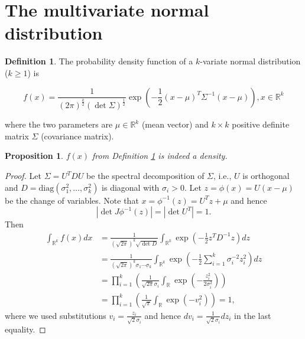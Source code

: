 \documentclass{book}
\theoremstyle{plain}%
\newtheorem{proposition}{Proposition}[section]
\theoremstyle{definition}
\newtheorem{definition}{Definition}[section]
\begin{document}
\section{The multivariate normal distribution}

\begin{definition}
The probability density function of a $k$-variate normal distribution ($k \geq 1$) is

$$f(x) = \frac{1}{(2\pi)^\frac{k}{2}(\det\Sigma)^\frac{1}{2}} \exp\left(-\frac{1}{2}(x-\mu)^T\Sigma^{-1}(x - \mu)\right), x \in \mathbb{R}^k$$

where the two parameters are $\mu \in \mathbb{R}^k$ (mean vector) and $k \times k$ positive definite matrix $\Sigma$ (covariance matrix).\label{def:normal}
\end{definition}

    \begin{proposition}
        \label{density}
        $f(x)$ from Definition \ref{def:normal} is indeed a density.
    \end{proposition}

\begin{proof}
    Let $\Sigma=U^TDU$ be the spectral decomposition of
    $\Sigma$, i.e., $U$ is orthogonal and $D=\mathrm{diag}(\sigma_1^2,\ldots,\sigma_k^2)$ is diagonal with $\sigma_i>0$.
    Let $z=\phi(x)=U(x-\mu)$ be the change of variables. Note that
    $x=\phi^{-1}(z)=U^Tz+\mu$ and
    hence 
    $$|\det J\phi^{-1}(z)|=
        |\det U^T|=1.$$
    Then
    \begin{align*}
    \int_{\mathbb{R}^k} f(x)dx
    &=
    \frac{1}{
    (\sqrt{2\pi})^k
    \sqrt{\det D}
    }\int_{\mathbb{R}^k} 
    \exp\left(
    -\frac{1}{2}
    z^T D^{-1} z
    \right)
    dz\\
    &=
    \frac{1}{
    (\sqrt{2\pi})^k
    \sigma_1\cdots\sigma_k}
    \int_{\mathbb{R}^k} 
    \exp\left(
    -\frac{1}{2}
    \sum_{i=1}^k
    \sigma_i^{-2}
    z_i^2
    \right)
    dz\\
    &=
    \prod_{i=1}^k
    \left(
    \frac{1}{\sqrt{2\pi}\sigma_i}
    \int_{\mathbb{R}}
    \exp\left(-\frac{z_i^2}{2\sigma_i^2}\right)
    \right)\\
    &=
    \prod_{i=1}^k
    \left(
    \frac{1}{\sqrt{\pi}}
    \int_{\mathbb{R}}
    \exp\left(-v_i^2\right)
    \right)=1,
    \end{align*}
    where we used substitutions 
    $v_i=\frac{z_i}{\sqrt{2}\sigma_i}$
    and hence $dv_i=\frac{1}{\sqrt{2}\sigma_i}dz_i$
    in the last equality.
    \end{proof}
\end{document}
